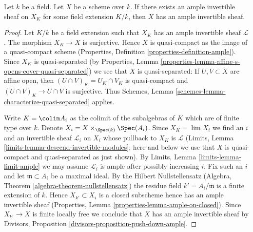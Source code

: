 \begin{lemma}
\label{lemma-ample-after-field-extension}
Let $k$ be a field. Let $X$ be a scheme over $k$.
If there exists an ample invertible sheaf on $X_K$ for some
field extension $K/k$, then $X$ has an ample invertible
sheaf.
\end{lemma}

\begin{proof}
Let $K/k$ be a field extension such that $X_K$ has
an ample invertible sheaf $\mathcal{L}$.
The morphism $X_K \to X$ is surjective. Hence $X$ is quasi-compact
as the image of a quasi-compact scheme (Properties, Definition
\ref{properties-definition-ample}). Since $X_K$ is quasi-separated
(by Properties, Lemma
\ref{properties-lemma-affine-s-opens-cover-quasi-separated})
we see that $X$ is quasi-separated: If $U, V \subset X$ are
affine open, then $(U \cap V)_K = U_K \cap V_K$ is quasi-compact
and $(U \cap V)_K \to U \cap V$ is surjective. Thus
Schemes, Lemma \ref{schemes-lemma-characterize-quasi-separated} applies.

\medskip\noindent
Write $K = \colim A_i$ as the colimit of the subalgebras of $K$
which are of finite type over $k$. Denote
$X_i = X \times_{\Spec(k)} \Spec(A_i)$.
Since $X_K = \lim X_i$ we find an $i$ and an invertible sheaf
$\mathcal{L}_i$ on $X_i$ whose pullback to $X_K$ is $\mathcal{L}$
(Limits, Lemma \ref{limits-lemma-descend-invertible-modules};
here and below we use that $X$ is quasi-compact and quasi-separated as
just shown). By Limits, Lemma \ref{limits-lemma-limit-ample}
we may assume $\mathcal{L}_i$ is ample after possibly increasing $i$.
Fix such an $i$ and let $\mathfrak m \subset A_i$ be a maximal
ideal. By the Hilbert Nullstellensatz
(Algebra, Theorem \ref{algebra-theorem-nullstellensatz})
the residue field $k' = A_i/\mathfrak m$ is a finite
extension of $k$. Hence $X_{k'} \subset X_i$ is a closed subscheme
hence has an ample invertible sheaf
(Properties, Lemma \ref{properties-lemma-ample-on-closed}).
Since $X_{k'} \to X$ is finite locally free we conclude
that $X$ has an ample invertible sheaf by
Divisors, Proposition \ref{divisors-proposition-push-down-ample}.
\end{proof}